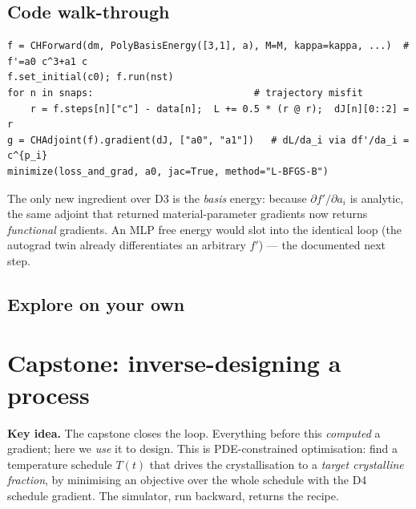 \section{Code walk-through}

\begin{lstlisting}
f = CHForward(dm, PolyBasisEnergy([3,1], a), M=M, kappa=kappa, ...)  # f'=a0 c^3+a1 c
f.set_initial(c0); f.run(nst)
for n in snaps:                            # trajectory misfit
    r = f.steps[n]["c"] - data[n];  L += 0.5 * (r @ r);  dJ[n][0::2] = r
g = CHAdjoint(f).gradient(dJ, ["a0", "a1"])   # dL/da_i via df'/da_i = c^{p_i}
minimize(loss_and_grad, a0, jac=True, method="L-BFGS-B")
\end{lstlisting}
The only new ingredient over D3 is the \emph{basis} energy: because
$\partial f'/\partial a_i$ is analytic, the same adjoint that returned
material-parameter gradients now returns \emph{functional} gradients. An
MLP free energy would slot into the identical loop (the autograd twin
already differentiates an arbitrary $f'$) --- the documented next step.

\section{Explore on your own}



\chapter{Capstone: inverse-designing a process}
\label{ch:d7}

\begin{keybox}
\textbf{Key idea.} The capstone closes the loop. Everything before this
\emph{computed} a gradient; here we \emph{use} it to design. This is
PDE-constrained optimisation: find a temperature schedule $T(t)$ that
drives the crystallisation to a \emph{target crystalline fraction}, by
minimising an objective over the whole schedule with the D4 schedule
gradient. The simulator, run backward, returns the recipe.
\end{keybox}

